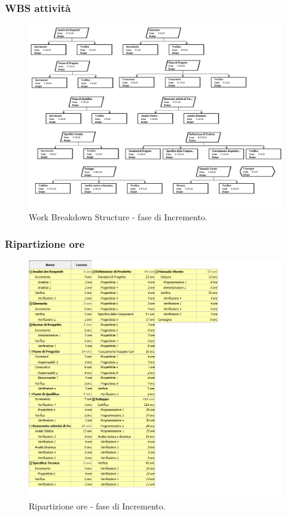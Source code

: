 \documentclass[a4paper]{article}
\begin{document}
			\subsubsection{WBS attività}
				\begin{figure}[H]
					\centering
					\includegraphics[scale=0.3]{wbs_incremento}
					\caption{Work Breakdown Structure - fase di Incremento.}
				\end{figure}
			\subsubsection{Ripartizione ore}
				\begin{figure}[H]
					\centering
					\includegraphics[scale=0.6]{ro_incremento}
					\caption{Ripartizione ore - fase di Incremento.}
				\end{figure}
				
\end{document}

